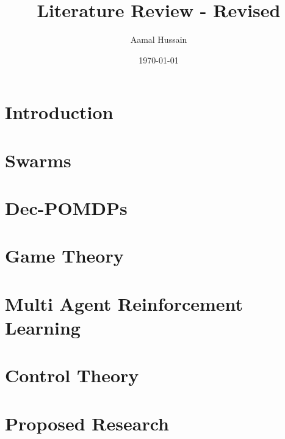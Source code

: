 \documentclass[11pt]{report}
\title{Literature Review - Revised}
\author{Aamal Hussain}
\date{\today}
\begin{document}
\maketitle 

\tableofcontents

\chapter{Introduction}  \label{ch::Intro}

\chapter{Swarms}  \label{ch::Swarms}

\chapter{Dec-POMDPs}  \label{ch::Dec-POMDPs}

\chapter{Game Theory}  \label{ch::GameTheory}

\chapter{Multi Agent Reinforcement Learning}  \label{ch::MARL}

\chapter{Control Theory}  \label{ch::ControlTheory}

\chapter{Proposed Research}  \label{ch::Proposals}

 


\end{document}
